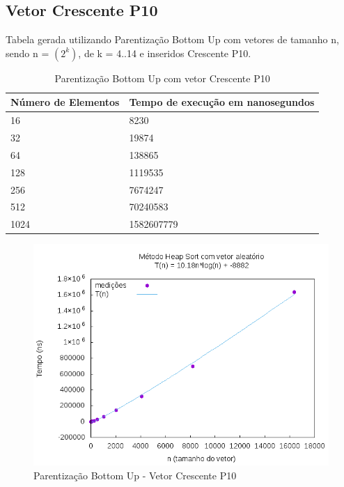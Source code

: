 \documentclass[12pt,a4paper,twoside]{report}
\begin{document}
\subsection{Vetor Crescente P10}
Tabela gerada utilizando Parentização Bottom Up com vetores de tamanho n, sendo n = $(2^k)$, de k = 4..14 e inseridos Crescente P10.
\begin{table}[H]
\centering
\caption{Parentização Bottom Up com vetor Crescente P10}
\label{my-label}
\begin{tabular}{|l|l|}
\hline
\multicolumn{1}{|c|}{\textbf{Número de Elementos}} & \multicolumn{1}{c|}{\textbf{Tempo de execução em nanosegundos}} \\ \hline
16 & 8230 \\ \hline
32 & 19874 \\ \hline
64 & 138865 \\ \hline
128 & 1119535 \\ \hline
256 & 7674247 \\ \hline
512 & 70240583 \\ \hline
1024 & 1582607779 \\ \hline
\end{tabular}
\end{table}

\begin{figure}[H]
    \centering
    \includegraphics[width=0.7\linewidth]{graficos/HeapSort/vIntAleatorio/vIntAleatorio.png}
  \caption{Parentização Bottom Up - Vetor Crescente P10}
\end{figure}
\end{document}
